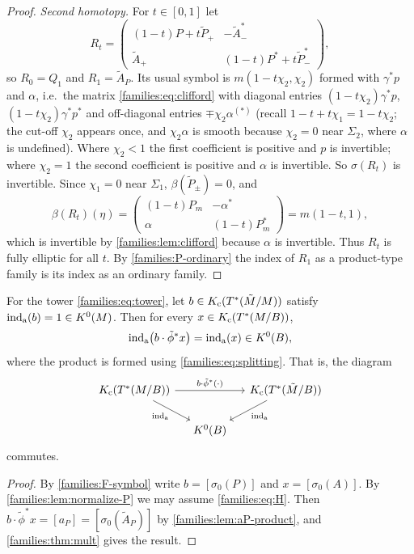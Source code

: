 \begin{proof}
  \emph{Second homotopy.} For $t\in[0,1]$ let
  \begin{equation*}
    R_t=\begin{pmatrix}(1-t)P+t\tilde P_+&-\tilde A_-^*\\
    \tilde A_+&(1-t)P^*+t\tilde P_-^*\end{pmatrix},
  \end{equation*}
  so $R_0=Q_1$ and $R_1=\tilde A_P$. Its usual symbol is
  $m(1-t\chi_2,\chi_2)$ formed with $\gamma^*p$ and $\alpha$, i.e.\ the
  matrix \eqref{families:eq:clifford} with diagonal entries
  $(1-t\chi_2)\gamma^*p$, $(1-t\chi_2)\gamma^*p^*$ and off-diagonal entries
  $\mp\chi_2\alpha^{(*)}$ (recall $1-t+t\chi_1=1-t\chi_2$; the cut-off $\chi_2$
  appears once, and $\chi_2\alpha$ is smooth because $\chi_2=0$ near
  $\Sigma_2$, where $\alpha$ is undefined). Where $\chi_2<1$ the first
  coefficient is positive and $p$ is invertible; where $\chi_2=1$ the second
  coefficient is positive and $\alpha$ is invertible. So $\sigma(R_t)$ is invertible. Since $\chi_1=0$ near
  $\Sigma_1$, $\beta(\tilde P_\pm)=0$, and
  \begin{equation*}
    \beta(R_t)(\eta)=\begin{pmatrix}(1-t)P_m&-\alpha^*\\\alpha&(1-t)P_m^*
    \end{pmatrix}=m(1-t,1),
  \end{equation*}
  which is invertible by \cref{families:lem:clifford} because $\alpha$ is
  invertible. Thus $R_t$ is fully elliptic for all $t$. By
  \ref{families:P-ordinary} the index of $R_1$ as a product-type family is its
  index as an ordinary family.
\end{proof}

\begin{corollary}\label{families:cor:mult}
  For the tower \eqref{families:eq:tower}, let $b\in K_{\mathrm{c}}(T^*(\tilde M/M))$
  satisfy $\operatorname{ind}_{\mathrm{a}}(b)=1\in K^0(M)$. Then for every $x\in K_{\mathrm{c}}(T^*(M/B))$,
  \begin{equation*}
    \operatorname{ind}_{\mathrm{a}}\bigl(b\cdot\tilde\phi^*x\bigr)=\operatorname{ind}_{\mathrm{a}}(x)\in K^0(B),
  \end{equation*}
  where the product is formed using \eqref{families:eq:splitting}. That is,
  the diagram
  \begin{equation*}
    \begin{tikzcd}[column sep=small]
      \Kc(T^*(M/B))\arrow[rr,"b\cdot\tilde\phi^*(\cdot)"]\arrow[dr,"\inda"']&&
      \Kc(T^*(\tilde M/B))\arrow[dl,"\inda"]\\
      &K^0(B)&
    \end{tikzcd}
  \end{equation*}
  commutes.
\end{corollary}
\begin{proof}
  By \ref{families:F-symbol} write $b=[\sigma_0(P)]$ and $x=[\sigma_0(A)]$.
  By \cref{families:lem:normalize-P} we may assume \eqref{families:eq:H}.
  Then $b\cdot\tilde\phi^*x=[a_P]=[\sigma_0(\tilde A_P)]$ by
  \cref{families:lem:aP-product}, and \cref{families:thm:mult} gives the
  result.
\end{proof}

